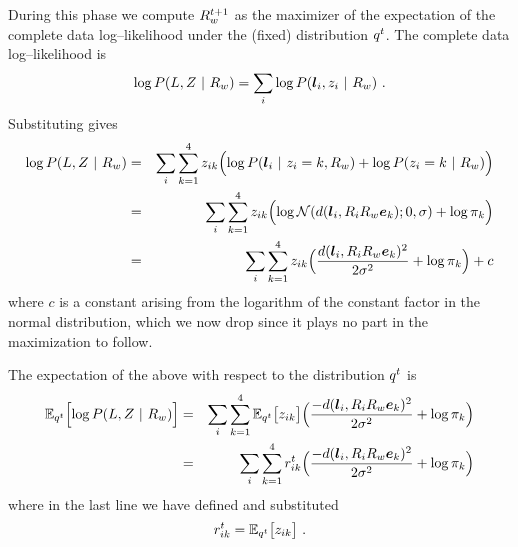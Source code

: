 During this phase we compute $\SceneR^{t+1}$ as the maximizer of the
expectation of the complete data log--likelihood under the (fixed)
distribution $\PosteriorEst^t$. The complete data log--likelihood is
\begin{equation}
  \label{eq:complete-loglikelihood}
  \log P(\LineSegs,\Indicators ~|~ \SceneR) =
  \sum_i \log P(\LineSeg_i,\Indicator_i ~|~ \SceneR) ~.
\end{equation}
Substituting  gives
\begin{eqnarray}
  \log P(\LineSegs,\Indicators ~|~ \SceneR) 
  &=&
  \sum_i \sum_{k=1}^4 \Indicator_{ik} \Bigl(
    \log P(\LineSeg_i ~|~ \Indicator_i=k, \SceneR)
    + \log P(\Indicator_i=k ~|~ \SceneR)
  \Bigr)\\
  &=&
  \sum_i \sum_{k=1}^4 \Indicator_{ik} 
  \Bigl(
    \log \NormalDistr(\dist(\LineSeg_i, \CamR_i\SceneR\ebasis_k);0,\sigma)
    + \log \Mixing_k
  \Bigr)\\
  &=&
  \sum_i \sum_{k=1}^4 \Indicator_{ik} 
  \Bigl(
    \frac{\dist(\LineSeg_i, \CamR_i\SceneR\ebasis_k)^2}{2\sigma^2}
    + \log \Mixing_k
  \Bigr) + c\\
\end{eqnarray}
where $c$ is a constant arising from the logarithm of the constant
factor in the normal distribution, which we now drop since it plays no
part in the maximization to follow.

The expectation of the above with respect to the distribution
$\PosteriorEst^t$ is
\begin{eqnarray}
  \Expected_{\PosteriorEst^t}\Bigl[
    \log P(\LineSegs,\Indicators ~|~ \SceneR) 
  \Bigr]
  &=&
  \sum_i \sum_{k=1}^4
  \Expected_{\PosteriorEst^t} \bigl[ \Indicator_{ik} \bigr]
  \Bigl(
    \frac{-\dist(\LineSeg_i, \CamR_i\SceneR\ebasis_k)^2}{2\sigma^2}
    + \log \Mixing_k
  \Bigr)\\
  &=&
  \label{eq:expected-lik}
  \sum_i \sum_{k=1}^4
  \Resp_{ik}^t
  \Bigl(
    \frac{-\dist(\LineSeg_i, \CamR_i\SceneR\ebasis_k)^2}{2\sigma^2}
    + \log \Mixing_k
  \Bigr)
\end{eqnarray}
where in the last line we have defined and substituted
\begin{equation}
  \Resp_{ik}^t = 
  \Expected_{\PosteriorEst^t} \bigl[ \Indicator_{ik} \bigr] ~.
\end{equation}

